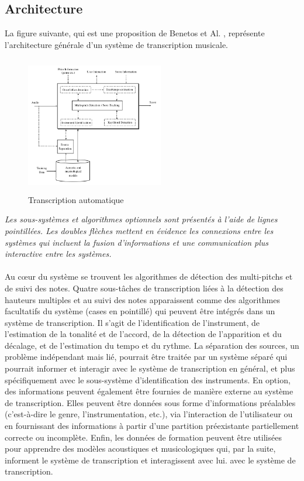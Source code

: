 \subsection*{Architecture}
La figure suivante, qui est une proposition de Benetos et Al. \cite{article1}, représente l'architecture générale d'un système de transcription musicale.
\begin{figure}[h]
	\includegraphics[height=60mm, width=60mm]{z_images/1_automatic_transcription/0_general_process.png}
	\caption{Transcription automatique}
\end{figure}
\textit{Les sous-systèmes et algorithmes optionnels sont présentés à l'aide de lignes pointillées. Les doubles flèches mettent en évidence les connexions entre les systèmes qui incluent la fusion d'informations et une communication plus interactive entre les systèmes.}\\\\
Au cœur du système se trouvent les algorithmes de détection des multi-pitchs et de suivi des notes. Quatre sous-tâches de transcription liées à la détection des hauteurs multiples et au suivi des notes apparaissent comme des algorithmes facultatifs du système (cases en pointillé) qui peuvent être intégrés dans un système de transcription. Il s'agit de l'identification de l'instrument, de l'estimation de la tonalité et de l'accord, de la détection de l'apparition et du décalage, et de l'estimation du tempo et du rythme. La séparation des sources, un problème indépendant mais lié, pourrait être traitée par un système séparé qui pourrait informer et interagir avec le système de transcription en général, et plus spécifiquement avec le sous-système d'identification des instruments.
En option, des informations peuvent également être fournies de manière externe au système de transcription. Elles peuvent être données sous forme d'informations préalables (c'est-à-dire le genre, l'instrumentation, etc.), via l'interaction de l'utilisateur ou en fournissant des informations à partir d'une partition préexistante partiellement correcte ou incomplète. Enfin, les données de formation peuvent être utilisées pour apprendre des modèles acoustiques et musicologiques qui, par la suite, informent le système de transcription et interagissent avec lui. avec le système de transcription.\\
